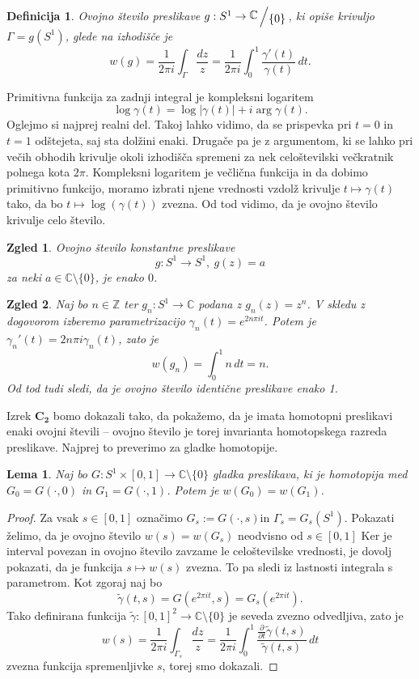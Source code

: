 \documentclass[10pt, a4paper]{article}
\newtheorem{defi}{Definicija}[section]
\newenvironment{noticeB}{%
  \tcolorbox[%
  notitle,
  empty,
  enhanced,  %
  breakable,
  coltext=black,
  colback=white, 
  fontupper=\rmfamily,
  parbox=false,
  noparskip,
  sharp corners,
  boxrule=-1pt,  %
  frame hidden,
  left=7pt,  %
  right=7pt,
  top=5pt,
  bottom=5pt,
  before skip=2.5ex plus 2pt,
  after skip=2.5ex plus 2pt,
  borderline west = {1.5pt}{-0.1pt}{blue!30!black}, %
  overlay unbroken and last={%
    \draw[color=black, line width=1.25pt]
    ($(frame.south west)+(1.pt, -0.1pt)$) -- ++(2em, 0);
  }
  ]}
{\endtcolorbox}
\newenvironment{definicija}{\begin{defi}\begin{noticeB}}{%
    \end{noticeB}\end{defi}}
\newtheorem{zgled}{Zgled}[section]
\newtheorem{lema}[izr]{Lema}
\newenvironment{noticeC}{%
  \tcolorbox[%
  notitle,
  empty,
  enhanced,  %
  breakable,
  coltext=black, 
  fontupper=\rmfamily,
  parbox=false,
  noparskip,
  sharp corners,
  boxrule=-1pt,  %
  frame hidden,
  left=7pt,  %
  right=7pt,
  top=5pt,
  bottom=5pt,
  before skip=2.5ex plus 2pt,
  after skip=2.5ex plus 2pt,
  overlay unbroken and last={%
  },
  ]}
{\endtcolorbox}
\newenvironment{dokaz}%
  {\begin{noticeC}\begin{proof}}%
  {\end{proof}\end{noticeC}}
\newcommand{\Z}{\mathbb {Z}}
\newcommand{\C}{\mathbb {C}}
\newcommand{\quot}[2]{{\raisebox{0.1em}{$#1$}\left/\raisebox{-0.2em}{$#2$}\right.}}
\begin{document}
\begin{definicija}
  Ovojno število preslikave $g: S^1 \to \quot{\C}{\{0\}}$, ki opiše krivuljo $\Gamma = g(S^1)$, glede na izhodišče 
  je 
  $$w(g) = \frac{1}{2 \pi i} \int_{\Gamma} \frac{dz}{z} = \frac{1}{2 \pi i} \int_0 ^1 \frac{\gamma'(t)}{\gamma(t)}\, dt.$$
\end{definicija}

Primitivna funkcija za zadnji integral je kompleksni logaritem 
$$\log \gamma(t) = \log |\gamma(t)| + i \arg \gamma(t).$$
Oglejmo si najprej realni del. Takoj lahko vidimo, da se prispevka pri 
$t = 0$ in $t = 1$ odštejeta, saj sta dolžini enaki.
Drugače pa je z argumentom, ki se lahko pri večih obhodih
krivulje okoli izhodišča spremeni za nek celoštevilski večkratnik 
polnega kota $2 \pi$. Kompleksni logaritem je večlična funkcija in 
da dobimo primitivno funkcijo, moramo izbrati njene vrednosti vzdolž krivulje 
$t \mapsto \gamma(t)$ tako, da bo $t \mapsto \log(\gamma(t))$ zvezna.
Od tod vidimo, da je ovojno število krivulje celo število.

\begin{zgled}
  Ovojno število konstantne preslikave $$g: S^1 \to S^1,\ g(z) = a$$
  za neki $a \in \C \setminus \{0\}$, je enako $0$.
\end{zgled}

\begin{zgled}
  Naj bo $n \in \Z$ ter $g_n : S^1 \to \C$ podana z $g_n(z) = z^n$.
  V skledu z dogovorom izberemo parametrizacijo $\gamma_n(t) = e^{2 n \pi i t}$.
  Potem je $\gamma_n '(t) = 2 n \pi i \gamma_n (t)$, zato je 
  $$w (g_n) = \int_0 ^1 n\, dt = n.$$
  Od tod tudi sledi, da je ovojno število identične preslikave enako 1.
\end{zgled}

Izrek $\mathbf{C_2}$ bomo dokazali tako, da pokažemo, da je imata 
homotopni preslikavi enaki ovojni števili -- ovojno število je torej 
invarianta homotopskega razreda preslikave.
Najprej to preverimo za gladke homotopije.

\begin{lema}
  Naj bo $G: S^1 \times [0, 1] \to \C \setminus \{0\}$ gladka preslikava, ki je homotopija med 
  $G_0 = G(\cdot , 0)$ in $G_1 = G(\cdot , 1)$. Potem je $w (G_0) = w (G_1)$.
\end{lema}

\begin{dokaz}
  Za vsak $s \in [0, 1]$ označimo $G_s := G(\cdot, s)$in $\Gamma_s = G_s (S^1)$.
  Pokazati želimo, da je ovojno število $w(s) = w(G_s)$ neodvisno od $s \in [0, 1]$
  Ker je interval povezan in ovojno število zavzame le celoštevilske vrednosti,
  je dovolj pokazati, da je funkcija $s \mapsto w(s)$ zvezna. To pa sledi iz lastnosti 
  integrala s parametrom. Kot zgoraj naj bo 
  $$\widetilde{\gamma} (t, s) = G(e^{2 \pi i t}, s) = G_s (e^{2 \pi i t}).$$
  Tako definirana funkcija $\widetilde{\gamma}: [0, 1]^2 \to \C \setminus \{0\}$ je seveda zvezno odvedljiva,
  zato je 
  $$w(s) = \frac{1}{2 \pi i} \int_{\Gamma_s} \frac{dz}{z} = \frac{1}{2 \pi i} \int_0 ^1 \frac{\frac{\partial}{\partial t} \widetilde{\gamma} (t, s)}{\widetilde{\gamma} (t, s)}\, dt$$
  zvezna funkcija spremenljivke $s$, torej smo dokazali. 
\end{dokaz}
\end{document}
